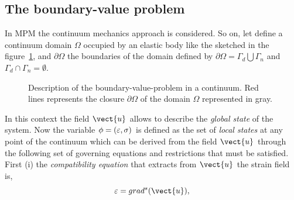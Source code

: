 \subsection{The boundary-value problem}
\label{sec:The boundary-value-problem}
In MPM the continuum mechanics approach is considered. So on, let
define a continuum domain $\varOmega$ occupied by an elastic body like
the sketched in the figure~\ref{fig:Continuum-solid}, and $\partial
\varOmega$ the boundaries of the domain defined by $\partial \varOmega
= \Gamma_d \bigcup \Gamma_n$ and $\Gamma_d \cap  \Gamma_n = \emptyset$.
\begin{figure}\sidecaption
  \centering
  \caption{Description of the boundary-value-problem in a
    continuum. Red lines represents the closure $\partial \varOmega$
    of the domain $\varOmega$ represented in gray.}
  \label{fig:Continuum-solid}
\end{figure}
In this context the field $\vect{u}$ allows to describe the \textit{global state}
of the system. Now the variable $\phi =
(\mathsf{\varepsilon},\mathsf{\sigma})$ is defined as the set of \textit{local
  states} at any point of the continuum which can be derived from the
field $\vect{u}$ through the following set of governing equations and
restrictions that must be satisfied. First (i) the \textit{compatibility
  equation} that extracts from $\vect{u}$ the strain field is,
\begin{equation}
  \label{eq:Compatibility-equation}
  \tens{\varepsilon} = \GradS{\vect{u}},
\end{equation}
